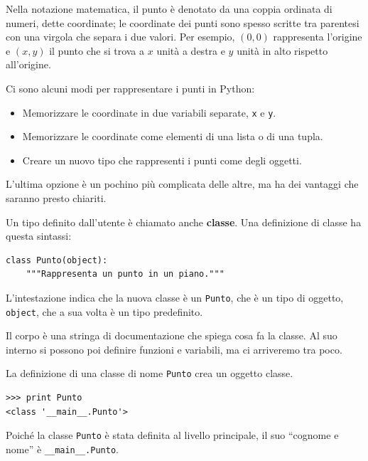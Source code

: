 \documentclass[10pt]{book}
\begin{document}
Nella notazione matematica, il punto è denotato da una coppia ordinata di numeri, dette coordinate; le coordinate dei punti sono spesso scritte tra parentesi con una virgola che separa i due valori. Per esempio, $(0,0)$ rappresenta l'origine e $(x,y)$ il punto che si trova a $x$ unità a destra e $y$ unità in alto rispetto all'origine.

Ci sono alcuni modi per rappresentare i punti in Python:

\begin{itemize}

\item Memorizzare le coordinate in due variabili separate, {\tt x} e {\tt y}.

\item Memorizzare le coordinate come elementi di una lista o di una tupla.

\item Creare un nuovo tipo che rappresenti i punti come degli oggetti.

\end{itemize}

L'ultima opzione è un pochino più complicata delle altre, ma ha dei vantaggi che saranno presto chiariti.

Un tipo definito dall'utente è chiamato anche {\bf classe}.
Una definizione di classe ha questa sintassi:

\begin{verbatim}
class Punto(object):
    """Rappresenta un punto in un piano."""
\end{verbatim}
%
L'intestazione indica che la nuova classe è un {\tt Punto},
che è un tipo di oggetto, {\tt object}, che a sua volta è un tipo predefinito.

Il corpo è una stringa di documentazione che spiega cosa fa la classe. Al suo interno si possono poi definire funzioni e variabili, ma ci arriveremo tra poco.

La definizione di una classe di nome {\tt Punto} crea un oggetto classe.

\begin{verbatim}
>>> print Punto
<class '__main__.Punto'>
\end{verbatim}
%
Poiché la classe {\tt Punto} è stata definita al livello principale, il suo ``cognome e nome'' è \verb"__main__.Punto".
\end{document}
